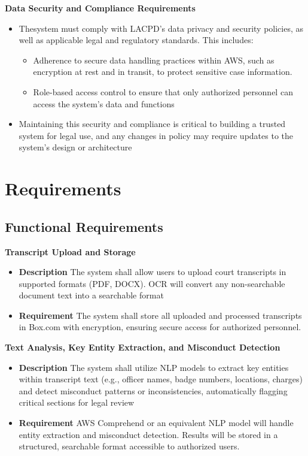 \documentclass[12pt]{article}
\begin{document}
\textbf{  Data Security and Compliance Requirements}
\begin{itemize}
  \item   Thesystem must comply with LACPD’s data privacy and security policies, as well as
 applicable legal and regulatory standards. This includes:
	\begin{itemize}
		\item    Adherence to secure data handling practices within AWS, such as encryption at rest and in transit, to protect sensitive case information.
		\item Role-based access control to ensure that only authorized personnel can access the system’s data and functions

	\end{itemize}
  \item Maintaining this security and compliance is critical to building a trusted system for legal use,
 and any changes in policy may require updates to the system’s design or architecture
\end{itemize}

\section{Requirements}
\subsection{Functional Requirements}

\textbf{ Transcript Upload and Storage}
\begin{itemize}
  \item \textbf{Description} The system shall allow users to upload court transcripts in supported formats
 (PDF, DOCX). OCR will convert any non-searchable document text into a searchable format
  \item \textbf{Requirement}  The system shall store all uploaded and processed transcripts in Box.com with
 encryption, ensuring secure access for authorized personnel.
\end{itemize}

\textbf{ Text Analysis, Key Entity Extraction, and Misconduct Detection}
\begin{itemize}
  \item \textbf{Description} The system shall utilize NLP models to extract key entities within transcript
 text (e.g., officer names, badge numbers, locations, charges) and detect misconduct patterns
 or inconsistencies, automatically flagging critical sections for legal review
  \item \textbf{Requirement} AWS Comprehend or an equivalent NLP model will handle entity extraction
 and misconduct detection. Results will be stored in a structured, searchable format accessible
 to authorized users.
\end{itemize}
\end{document}
